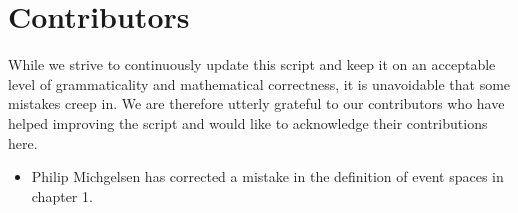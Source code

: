 \section*{Contributors}
While we strive to continuously update this script and keep it on an acceptable level of grammaticality and mathematical correctness, it is unavoidable that some
mistakes creep in. We are therefore utterly grateful to our contributors who have helped improving the script and would like to acknowledge their contributions here.
\begin{itemize}
\item Philip Michgelsen has corrected a mistake in the definition of event spaces in chapter 1.
\end{itemize}